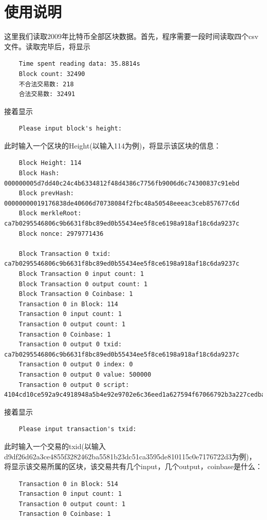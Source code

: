 \documentclass[10pt,a4paper]{article}
\begin{document}
    \section{使用说明}
    这里我们读取2009年比特币全部区块数据。首先，程序需要一段时间读取四个csv文件。读取完毕后，将显示
    \begin{verbatim}
    Time spent reading data: 35.8814s
    Block count: 32490
    不合法交易数: 218
    合法交易数: 32491
    \end{verbatim}
    接着显示
    \begin{verbatim}
    Please input block's height: 
    \end{verbatim}
    此时输入一个区块的Height(以输入114为例)，将显示该区块的信息：
    \begin{verbatim}
    Block Height: 114
    Block Hash: 000000005d7dd40c24c4b6334812f48d4386c7756fb9006d6c74300837c91ebd
    Block prevHash: 00000000019176838de40606d70738084f2fbc48a50548eeeac3ceb857677c6d
    Block merkleRoot: ca7b0295546806c9b6631f8bc89ed0b55434ee5f8ce6198a918af18c6da9237c
    Block nonce: 2979771436

    Block Transaction 0 txid: ca7b0295546806c9b6631f8bc89ed0b55434ee5f8ce6198a918af18c6da9237c
    Block Transaction 0 input count: 1
    Block Transaction 0 output count: 1
    Block Transaction 0 Coinbase: 1
    Transaction 0 in Block: 114
    Transaction 0 input count: 1
    Transaction 0 output count: 1
    Transaction 0 Coinbase: 1
    Transaction 0 output 0 txid: ca7b0295546806c9b6631f8bc89ed0b55434ee5f8ce6198a918af18c6da9237c
    Transaction 0 output 0 index: 0
    Transaction 0 output 0 value: 500000
    Transaction 0 output 0 script: 4104cd10ce592a9c4918948a5b4e92e9702e6c36eed1a627594f67066792b3a227cedba7be9df6e8117bee0499e243e4df90e13efdd8e14e1778e2247c0e16661057ac 
    \end{verbatim}
    接着显示
    \begin{verbatim}
    Please input transaction's txid: 
    \end{verbatim}
    此时输入一个交易的txid(以输入d9df26d62a3ce4855f3282462ba5581b23dc51ca3595de810115c0e7176722d3为例)，将显示该交易所属的区块，该交易共有几个input，几个output，coinbase是什么：
    \begin{verbatim}
    Transaction 0 in Block: 514
    Transaction 0 input count: 1
    Transaction 0 output count: 1
    Transaction 0 Coinbase: 1
    \end{verbatim}
    \newpage
\end{document}
